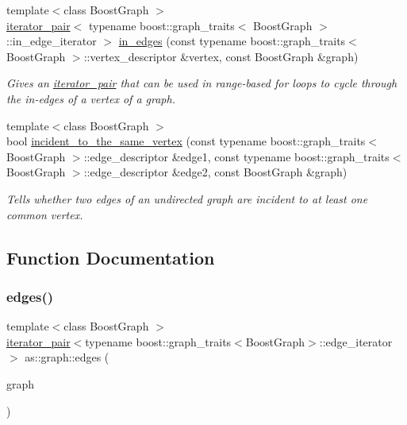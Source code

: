 \begin{DoxyCompactItemize}
{\footnotesize template$<$class Boost\+Graph $>$ }\\\hyperlink{classas_1_1iterator__pair}{iterator\+\_\+pair}$<$ typename boost\+::graph\+\_\+traits$<$ Boost\+Graph $>$\+::in\+\_\+edge\+\_\+iterator $>$ \hyperlink{namespaceas_1_1graph_ab75a465b1d5869f0ea8b698f02b067aa}{in\+\_\+edges} (const typename boost\+::graph\+\_\+traits$<$ Boost\+Graph $>$\+::vertex\+\_\+descriptor \&vertex, const Boost\+Graph \&graph)
\begin{DoxyCompactList}\small\item\em Gives an \hyperlink{classas_1_1iterator__pair}{iterator\+\_\+pair} that can be used in range-\/based for loops to cycle through the in-\/edges of a vertex of a graph. \end{DoxyCompactList}\item 
{\footnotesize template$<$class Boost\+Graph $>$ }\\bool \hyperlink{namespaceas_1_1graph_ac0b52ec1e242ac547157a42aac39e21a}{incident\+\_\+to\+\_\+the\+\_\+same\+\_\+vertex} (const typename boost\+::graph\+\_\+traits$<$ Boost\+Graph $>$\+::edge\+\_\+descriptor \&edge1, const typename boost\+::graph\+\_\+traits$<$ Boost\+Graph $>$\+::edge\+\_\+descriptor \&edge2, const Boost\+Graph \&graph)
\begin{DoxyCompactList}\small\item\em Tells whether two edges of an undirected graph are incident to at least one common vertex. \end{DoxyCompactList}\end{DoxyCompactItemize}


\subsection{Function Documentation}
\mbox{\label{namespaceas_1_1graph_ae44b728c4acaf47bc2bb010831df9452}} 
\subsubsection{\texorpdfstring{edges()}{edges()}}
{\footnotesize\ttfamily template$<$class Boost\+Graph $>$ \\
\hyperlink{classas_1_1iterator__pair}{iterator\+\_\+pair}$<$typename boost\+::graph\+\_\+traits$<$Boost\+Graph$>$\+::edge\+\_\+iterator$>$ as\+::graph\+::edges (\begin{DoxyParamCaption}\item[{const Boost\+Graph \&}]{graph }\end{DoxyParamCaption})\hspace{0.3cm}{\ttfamily [inline]}}




